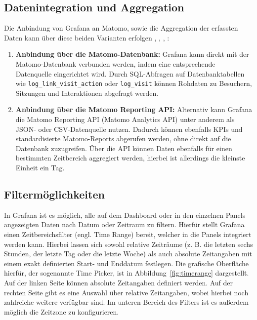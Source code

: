 \subsection{Datenintegration und Aggregation}
Die Anbindung von Grafana an Matomo, sowie die Aggregation der erfassten Daten kann über diese beiden Varianten erfolgen \parencite{Verteuil2022}, \parencite{MatomoDBConnection}, \parencite{MatomoReportingAPI}, \parencite{MatomoDBSchema}:

\begin{enumerate}
    \item \textbf{Anbindung über die Matomo-Datenbank:}  
    Grafana kann direkt mit der Matomo-Datenbank verbunden werden, indem eine entsprechende Datenquelle eingerichtet wird. Durch SQL-Abfragen auf Datenbanktabellen wie \verb|log_link_visit_action| oder \verb|log_visit| können Rohdaten zu Besuchern, Sitzungen und Interaktionen abgefragt werden. 
    \item \textbf{Anbindung über die Matomo Reporting API:}  
    Alternativ kann Grafana die Matomo Reporting API (Matomo Analytics API) unter anderem als JSON- oder CSV-Datenquelle nutzen. Dadurch können ebenfalls KPIs und standardisierte Matomo-Reports abgerufen werden, ohne direkt auf die Datenbank zuzugreifen. Über die API können Daten ebenfalls für einen bestimmten Zeitbereich aggregiert werden, hierbei ist allerdings die kleinste Einheit ein Tag.
\end{enumerate}

\subsection{Filtermöglichkeiten}
In Grafana ist es möglich, alle auf dem Dashboard oder in den einzelnen Panels angezeigten Daten nach Datum oder Zeitraum zu filtern. Hierfür stellt Grafana einen Zeitbereichsfilter (engl. Time Range) bereit, welcher in die Panels integriert werden kann. Hierbei lassen sich sowohl relative Zeiträume (z. B. die letzten sechs Stunden, der letzte Tag oder die letzte Woche) als auch absolute Zeitangaben mit einem exakt definierten Start- und Enddatum festlegen. Die grafische Oberfläche hierfür, der sogenannte Time Picker, ist in Abbildung~\ref{fig:timerange} dargestellt. Auf der linken Seite können absolute Zeitangaben definiert werden. Auf der rechten Seite gibt es eine Auswahl über relative Zeitangaben, wobei hierbei noch zahlreiche weitere verfügbar sind. Im unteren Bereich des Filters ist es außerdem möglich die Zeitzone zu konfigurieren. \parencite{GrafanaTimePicker}

